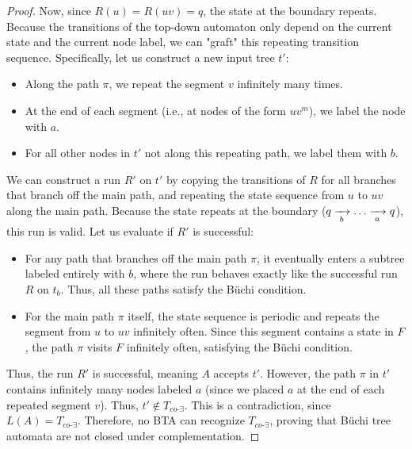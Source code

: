\begin{proof}
Now, since $R(u) = R(uv) = q$, the state at the boundary repeats. Because the transitions of the top-down automaton only depend on the current state and the current node label, we can "graft" this repeating transition sequence.
Specifically, let us construct a new input tree $t'$:
\begin{itemize}
    \item Along the path $\pi$, we repeat the segment $v$ infinitely many times.
    \item At the end of each segment (i.e., at nodes of the form $u v^m$), we label the node with $a$.
    \item For all other nodes in $t'$ not along this repeating path, we label them with $b$.
\end{itemize}
We can construct a run $R'$ on $t'$ by copying the transitions of $R$ for all branches that branch off the main path, and repeating the state sequence from $u$ to $uv$ along the main path.
Because the state repeats at the boundary ($q \xrightarrow[{\;b\;}]{} \dots \xrightarrow[{\;a\;}]{} q$), this run is valid.
Let us evaluate if $R'$ is successful:
\begin{itemize}
    \item For any path that branches off the main path $\pi$, it eventually enters a subtree labeled entirely with $b$, where the run behaves exactly like the successful run $R$ on $t_b$. Thus, all these paths satisfy the Büchi condition.
    \item For the main path $\pi$ itself, the state sequence is periodic and repeats the segment from $u$ to $uv$ infinitely often. Since this segment contains a state in $F$, the path $\pi$ visits $F$ infinitely often, satisfying the Büchi condition.
\end{itemize}
Thus, the run $R'$ is successful, meaning $A$ accepts $t'$.
However, the path $\pi$ in $t'$ contains infinitely many nodes labeled $a$ (since we placed $a$ at the end of each repeated segment $v$). Thus, $t' \notin T_{co\text{-}\exists}$.
This is a contradiction, since $L(A) = T_{co\text{-}\exists}$.
Therefore, no BTA can recognize $T_{co\text{-}\exists}$, proving that Büchi tree automata are not closed under complementation.
\end{proof}


